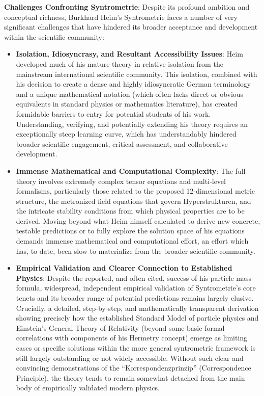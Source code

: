 \documentclass[
    12pt,              %
    a4paper,           %
    headings=normal,   %
    twoside=true,      %
    BCOR=8mm,          %
]{scrbook}
\begin{document}
\textbf{Challenges Confronting Syntrometrie}:
Despite its profound ambition and conceptual richness, Burkhard Heim's Syntrometrie faces a number of very significant challenges that have hindered its broader acceptance and development within the scientific community:
\begin{itemize}
    \item \textbf{Isolation, Idiosyncrasy, and Resultant Accessibility Issues}: Heim developed much of his mature theory in relative isolation from the mainstream international scientific community. This isolation, combined with his decision to create a dense and highly idiosyncratic German terminology and a unique mathematical notation (which often lacks direct or obvious equivalents in standard physics or mathematics literature), has created formidable barriers to entry for potential students of his work. Understanding, verifying, and potentially extending his theory requires an exceptionally steep learning curve, which has understandably hindered broader scientific engagement, critical assessment, and collaborative development.
    \item \textbf{Immense Mathematical and Computational Complexity}: The full theory involves extremely complex tensor equations and multi-level formalisms, particularly those related to the proposed 12-dimensional metric structure, the metronized field equations that govern Hyperstrukturen, and the intricate stability conditions from which physical properties are to be derived. Moving beyond what Heim himself calculated to derive new concrete, testable predictions or to fully explore the solution space of his equations demands immense mathematical and computational effort, an effort which has, to date, been slow to materialize from the broader scientific community.
    \item \textbf{Empirical Validation and Clearer Connection to Established Physics}: Despite the reported, and often cited, success of his particle mass formula, widespread, independent empirical validation of Syntrometrie's core tenets and its broader range of potential predictions remains largely elusive. Crucially, a detailed, step-by-step, and mathematically transparent derivation showing precisely how the established Standard Model of particle physics and Einstein's General Theory of Relativity (beyond some basic formal correlations with components of his Hermetry concept) emerge as limiting cases or specific solutions within the more general syntrometric framework is still largely outstanding or not widely accessible. Without such clear and convincing demonstrations of the \enquote{Korrespondenzprinzip} (Correspondence Principle), the theory tends to remain somewhat detached from the main body of empirically validated modern physics.

\end{itemize}
\end{document}
